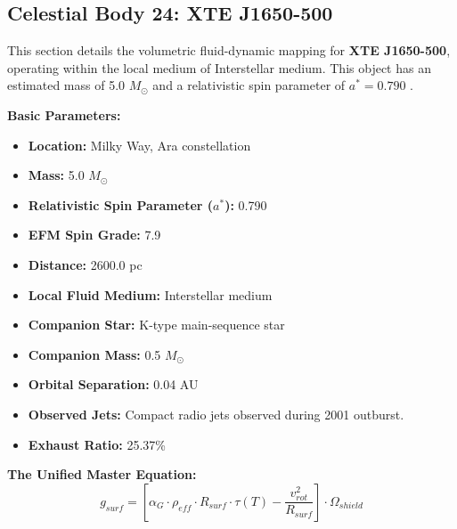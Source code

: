 \documentclass[11pt, a4paper]{article}
\begin{document}
\clearpage
\subsection{Celestial Body 24: XTE J1650-500}
This section details the volumetric fluid-dynamic mapping for \textbf{XTE J1650-500}, operating within the local medium of Interstellar medium. This object has an estimated mass of 5.0 $M_{\odot}$ and a relativistic spin parameter of $a^* = 0.790$ \cite{orosz2004, simbad}.

\vspace{0.5em}
\noindent \textbf{Basic Parameters:}
\begin{itemize}
  \item \textbf{Location:} Milky Way, Ara constellation
  \item \textbf{Mass:} 5.0 $M_{\odot}$
  \item \textbf{Relativistic Spin Parameter ($a^*$):} 0.790
  \item \textbf{EFM Spin Grade:} 7.9
  \item \textbf{Distance:} 2600.0 pc
  \item \textbf{Local Fluid Medium:} Interstellar medium
  \item \textbf{Companion Star:} K-type main-sequence star
  \item \textbf{Companion Mass:} 0.5 $M_{\odot}$
  \item \textbf{Orbital Separation:} 0.04 AU
  \item \textbf{Observed Jets:} Compact radio jets observed during 2001 outburst.
  \item \textbf{Exhaust Ratio:} 25.37\%
\end{itemize}

\vspace{0.5em}
\noindent \textbf{The Unified Master Equation:}
$$ g_{surf} = \left[ \alpha_G \cdot \rho_{eff} \cdot R_{surf} \cdot \tau(T) - \frac{v_{rot}^2}{R_{surf}} \right] \cdot \Omega_{shield} $$
\end{document}
